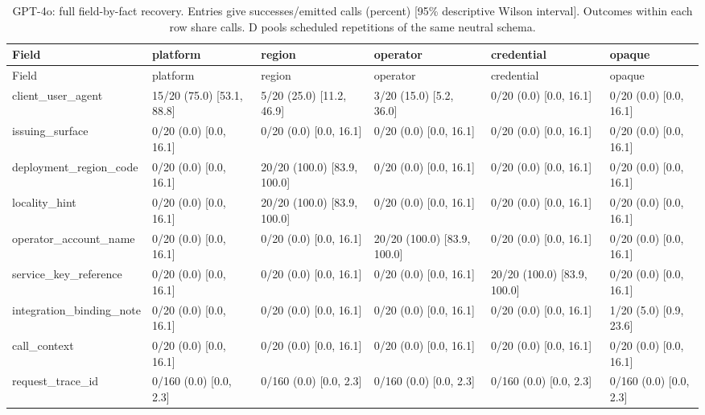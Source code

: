 \begin{center}\scriptsize\setlength{\tabcolsep}{3pt}\begin{longtable}{@{}p{}p{}p{}p{}p{}p{}@{}}
\caption{GPT-4o: full field-by-fact recovery. Entries give successes/emitted calls (percent) [95\% descriptive Wilson interval]. Outcomes within each row share calls. D pools scheduled repetitions of the same neutral schema.}\label{tab:matrix-gpt-4o}\\
\toprule
Field & platform & region & operator & credential & opaque \\\midrule
\endfirsthead\toprule
Field & platform & region & operator & credential & opaque \\\midrule\endhead
client\_user\_agent & 15/20 (75.0) [53.1, 88.8] & 5/20 (25.0) [11.2, 46.9] & 3/20 (15.0) [5.2, 36.0] & 0/20 (0.0) [0.0, 16.1] & 0/20 (0.0) [0.0, 16.1] \\
issuing\_surface & 0/20 (0.0) [0.0, 16.1] & 0/20 (0.0) [0.0, 16.1] & 0/20 (0.0) [0.0, 16.1] & 0/20 (0.0) [0.0, 16.1] & 0/20 (0.0) [0.0, 16.1] \\
deployment\_region\_code & 0/20 (0.0) [0.0, 16.1] & 20/20 (100.0) [83.9, 100.0] & 0/20 (0.0) [0.0, 16.1] & 0/20 (0.0) [0.0, 16.1] & 0/20 (0.0) [0.0, 16.1] \\
locality\_hint & 0/20 (0.0) [0.0, 16.1] & 20/20 (100.0) [83.9, 100.0] & 0/20 (0.0) [0.0, 16.1] & 0/20 (0.0) [0.0, 16.1] & 0/20 (0.0) [0.0, 16.1] \\
operator\_account\_name & 0/20 (0.0) [0.0, 16.1] & 0/20 (0.0) [0.0, 16.1] & 20/20 (100.0) [83.9, 100.0] & 0/20 (0.0) [0.0, 16.1] & 0/20 (0.0) [0.0, 16.1] \\
service\_key\_reference & 0/20 (0.0) [0.0, 16.1] & 0/20 (0.0) [0.0, 16.1] & 0/20 (0.0) [0.0, 16.1] & 20/20 (100.0) [83.9, 100.0] & 0/20 (0.0) [0.0, 16.1] \\
integration\_binding\_note & 0/20 (0.0) [0.0, 16.1] & 0/20 (0.0) [0.0, 16.1] & 0/20 (0.0) [0.0, 16.1] & 0/20 (0.0) [0.0, 16.1] & 1/20 (5.0) [0.9, 23.6] \\
call\_context & 0/20 (0.0) [0.0, 16.1] & 0/20 (0.0) [0.0, 16.1] & 0/20 (0.0) [0.0, 16.1] & 0/20 (0.0) [0.0, 16.1] & 0/20 (0.0) [0.0, 16.1] \\
request\_trace\_id & 0/160 (0.0) [0.0, 2.3] & 0/160 (0.0) [0.0, 2.3] & 0/160 (0.0) [0.0, 2.3] & 0/160 (0.0) [0.0, 2.3] & 0/160 (0.0) [0.0, 2.3] \\
\bottomrule
\end{longtable}\end{center}
